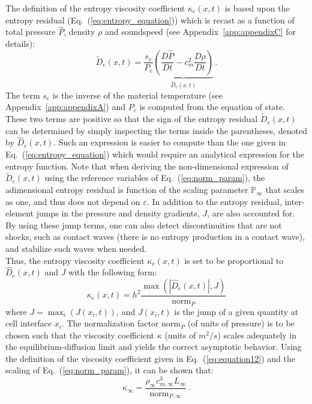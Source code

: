 \documentclass[review]{elsarticle}
\newcommand{\eqt}[1]{Eq.~(\ref{#1})}                     %
\newcommand{\app}[1]{Appendix~\ref{#1}}                     %
\newcommand{\norm}{\textrm{norm}}
\renewcommand{\Re}{\textrm{Re}}
\renewcommand{\Re}{\mathbb{P}_\infty}
\begin{document}
The definition of the entropy viscosity coefficient $\kappa_e(x,t)$ is based upon the entropy residual (\eqt{eq:entropy_equation}) which is recast as a function of total pressure $\hat{P}$, density $\rho$ and soundspeed (see \app{app:appendixC} for details):
\begin{equation}
\label{eq:equation9}
\tilde{D}_e(x,t) = \frac{s_e}{P_e} \underbrace{ \left( \frac{D\hat{P}}{Dt} - c_m^2 \frac{D\rho}{Dt} \right)}_\textrm{$\hat{D}_e(x,t)$} \,.
\end{equation}
The term $s_e$ is the inverse of the material temperature (see \app{app:appendixA}) and $P_e$ is computed from the equation of state. These two terms are positive so that the sign of the entropy residual $\tilde{D}_e(x,t)$ can be determined by simply inspecting the terms inside the parentheses, denoted by $\hat{D}_e(x,t)$. Such an expression is easier to compute than the one given in \eqt{eq:entropy_equation} which would require an analytical expression for the entropy function. Note that when deriving the non-dimensional expression of $\tilde{D}_e(x,t)$ using the reference variables of \eqt{eq:norm_param}, the adimensional entropy residual is function of the scaling parameter $\Re$ that scales as one, and thus does not depend on $\varepsilon$. In addition to the entropy residual, inter-element jumps in the pressure and density gradients, $J$, are also accounted for. By using these jump terms, one can also detect discontinuities that are not shocks, such as contact waves (there is no entropy production in a contact wave), and stabilize such waves when needed. \\
Thus, the entropy viscosity coefficient $\kappa_e(x,t)$ is set to be proportional to $\hat{D}_e(x,t)$ and $J$ with the following form: 
\begin{equation}
\label{eq:equation12}
\kappa_e(x,t) = h^2 \frac{\max (|\hat{D}_e(x,t)|, J)}{\norm_P}
\end{equation} 
where $J = \max_i (J(x_i,t))$, and $J(x_i,t)$ is the jump of a given quantity at cell interface $x_i$. The normalization factor $\norm_P$ (of units of pressure) is to be chosen such that the viscosity coefficient $\kappa$ (units of $m^2/s$) scales adequately in the equilibrium-diffusion limit and yields the correct asymptotic behavior. Using the definition of the viscosity coefficient given in \eqt{eq:equation12} and the scaling of \eqt{eq:norm_param}, it can be shown that:
%
\begin{equation}\label{eq:kappa_infty}
\kappa_\infty = \frac{\rho_\infty c^3_{m,\infty}  L_\infty}{\norm_{P,\infty}} \ .
\end{equation}
\end{document}
